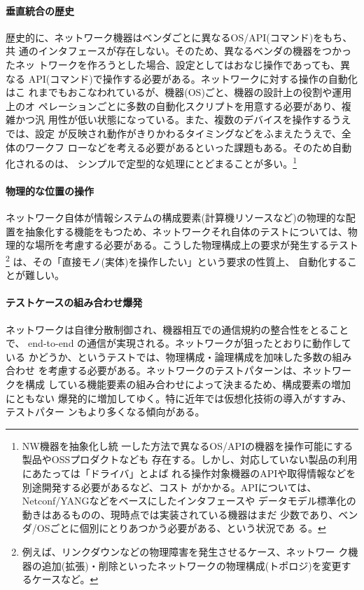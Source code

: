     \paragraph{垂直統合の歴史}
歴史的に、ネットワーク機器はベンダごとに異なるOS/API(コマンド)をもち、共
通のインタフェースが存在しない。そのため、異なるベンダの機器をつかったネッ
トワークを作ろうとした場合、設定としてはおなじ操作であっても、異なる
API(コマンド)で操作する必要がある。ネットワークに対する操作の自動化はこ
れまでもおこなわれているが、機器(OS)ごと、機器の設計上の役割や運用上のオ
ペレーションごとに多数の自動化スクリプトを用意する必要があり、複雑かつ汎
用性が低い状態になっている。また、複数のデバイスを操作するうえでは、設定
が反映され動作がきりかわるタイミングなどをふまえたうえで、全体のワークフ
ローなどを考える必要があるといった課題もある。そのため自動化されるのは、
シンプルで定型的な処理にとどまることが多い。\footnote{NW機器を抽象化し統
一した方法で異なるOS/APIの機器を操作可能にする製品やOSSプロダクトなども
存在する。しかし、対応していない製品の利用にあたっては「ドライバ」とよば
れる操作対象機器のAPIや取得情報などを別途開発する必要があるなど、コスト
がかかる。APIについては、Netconf/YANGなどをベースにしたインタフェースや
データモデル標準化の動きはあるものの、現時点では実装されている機器はまだ
少数であり、ベンダ/OSごとに個別にとりあつかう必要がある、という状況であ
る。}

    \paragraph{物理的な位置の操作}
ネットワーク自体が情報システムの構成要素(計算機リソースなど)の物理的な配
置を抽象化する機能をもつため、ネットワークそれ自体のテストについては、物
理的な場所を考慮する必要がある。こうした物理構成上の要求が発生するテスト
\footnote{例えば、リンクダウンなどの物理障害を発生させるケース、ネットワー
ク機器の追加(拡張)・削除といったネットワークの物理構成(トポロジ)を変更す
るケースなど。} は、その「直接モノ(実体)を操作したい」という要求の性質上、
自動化することが難しい。

    \paragraph{テストケースの組み合わせ爆発}
ネットワークは自律分散制御され、機器相互での通信規約の整合性をとることで、
end-to-end の通信が実現される。ネットワークが狙ったとおりに動作している
かどうか、というテストでは、物理構成・論理構成を加味した多数の組み合わせ
を考慮する必要がある。ネットワークのテストパターンは、ネットワークを構成
している機能要素の組み合わせによって決まるため、構成要素の増加にともない
爆発的に増加してゆく。特に近年では仮想化技術の導入がすすみ、テストパター
ンもより多くなる傾向がある。

